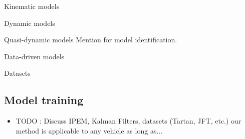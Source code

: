 Kinematic models
\citep{Anousaki2004}
\citep{Mandow2007}
\citep{Wang2015}
\citep{Baril2020}

Dynamic models
\citep{Yu2009}
\citep{Seegmiller2016}
\citep{Yang2022}

Quasi-dynamic models
\citep{Seegmiller2014}
\citep{Ostafew2016}
\citep{Rabiee2019}
\citep{Takemura2021}
Mention \citep{Seegmiller2013} for model identification.

Data-driven models
\citep{Williams2018}
\citep{Nagariya2020}
\citep{Tremblay2021}

\lightlipsum[1-3]

Datasets
\citep{Triest2022}


\subsection{Model training}

\begin{itemize}
	\item TODO : Discuss IPEM, Kalman Filters, datasets (Tartan, JFT, etc.) our method is applicable to any vehicle as long as...
\end{itemize}

\lightlipsum[1-3]
